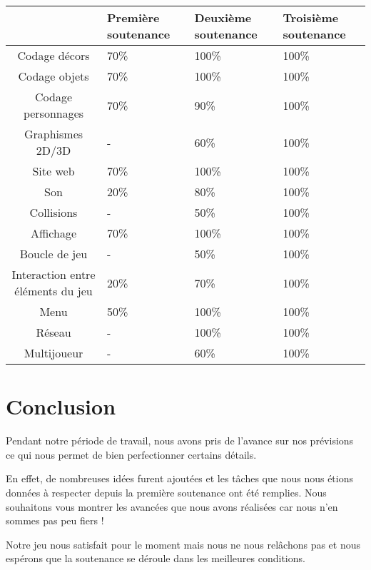 \documentclass{article}
\begin{document}
\begin{tabular}{|c|p{2cm}|p{2cm}|p{2cm}|}


\hline
& Première soutenance & Deuxième soutenance & Troisième soutenance\\ 
\hline

Codage décors & 70\% & 100\% & 100\%\\
\hline
Codage objets & 70\% & 100\% & 100\%\\
\hline
Codage personnages & 70\% & 90\% & 100\%\\
\hline

Graphismes 2D/3D & - & 60\% & 100\%\\
\hline

Site web & 70\% & 100\% & 100\%\\
\hline

Son & 20\% & 80\% & 100\%\\
\hline

Collisions & - & 50\% & 100\%\\
\hline

Affichage & 70\% & 100\% & 100\%\\
\hline

Boucle de jeu & - & 50\% & 100\%\\
\hline

Interaction entre éléments du jeu & 20\% & 70\% & 100\%\\
\hline

Menu & 50\% & 100\% & 100\%\\
\hline

Réseau & - & 100\% & 100\%\\
\hline

Multijoueur & - & 60\% & 100\%\\
\hline

\end{tabular}

\section{Conclusion}
\par
Pendant notre période de travail, nous avons pris de l’avance sur nos prévisions ce qui nous permet de bien perfectionner certains détails.
\par
En effet, de nombreuses idées furent ajoutées  et les tâches que nous nous étions données à respecter depuis la première soutenance ont été remplies. Nous souhaitons vous montrer les avancées que nous avons réalisées car nous n’en sommes pas peu fiers !
\par
Notre jeu nous satisfait pour le moment mais nous ne nous relâchons pas et nous espérons que la soutenance se déroule dans les meilleures conditions.

\newpage
\thispagestyle{empty}
\pagestyle{fancyplain} \chead{} 
\listoffigures
\end{document}
